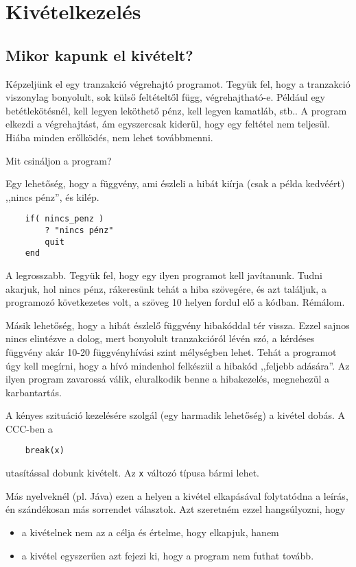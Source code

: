 
\section{Kivételkezelés}

\subsection{Mikor kapunk el  kivételt?}

Képzeljünk el egy tranzakció végrehajtó programot. 
Tegyük fel, hogy a tranzakció viszonylag bonyolult, 
sok külső feltételtől függ, végrehajtható-e.
Például egy betétlekötésnél, kell legyen leköthető pénz,
kell legyen kamatláb, stb..
A program elkezdi a végrehajtást, ám egyszercsak kiderül,
hogy egy feltétel nem teljesül. Hiába minden erőlködés, 
nem lehet továbbmenni.

Mit csináljon a program? 

Egy lehetőség, hogy a függvény, ami észleli a hibát kiírja 
(csak a példa kedvéért) ,,nincs pénz'', és kilép. 
\begin{verbatim}
    if( nincs_penz )
        ? "nincs pénz"
        quit
    end
\end{verbatim}
A legrosszabb. Tegyük fel, hogy egy ilyen programot kell javítanunk. 
Tudni akarjuk, hol nincs pénz, rákeresünk tehát a hiba szövegére,
és azt találjuk, a programozó következetes volt, a szöveg 10 helyen fordul 
elő a kódban. Rémálom.

Másik lehetőség, hogy a hibát észlelő függvény hibakóddal tér vissza. 
Ezzel sajnos nincs elintézve a dolog, mert bonyolult tranzakcióról lévén szó,
a kérdéses függvény akár 10-20 függvényhívási szint mélységben lehet. Tehát
a programot úgy kell megírni, hogy a hívó mindenhol felkészül a
hibakód ,,feljebb adására''. Az ilyen program zavarossá válik,
eluralkodik benne a hibakezelés, megnehezül a karbantartás.

A kényes szituáció kezelésére szolgál (egy harmadik lehetőség) a kivétel dobás. 
A CCC-ben a
\begin{verbatim}
    break(x)
\end{verbatim}
utasítással dobunk kivételt. Az \verb!x! változó típusa bármi lehet.


Más nyelveknél (pl. Jáva) ezen a helyen a kivétel elkapásával folytatódna a leírás,
én szándékosan más sorrendet választok. Azt szeretném ezzel hangsúlyozni, hogy
\begin{itemize}
 \item a kivételnek nem az a célja és értelme, hogy elkapjuk, hanem
 \item a kivétel egyszerűen azt fejezi ki, hogy a program nem futhat tovább.
\end{itemize}

